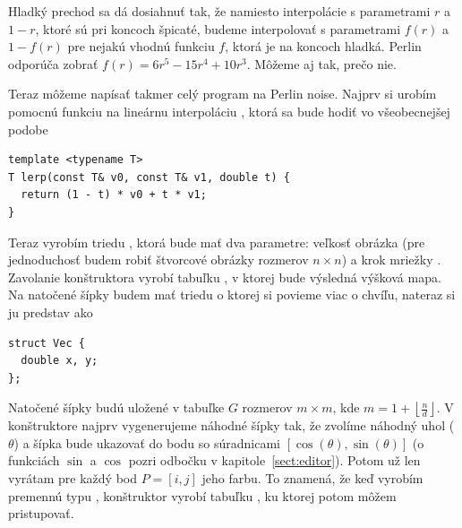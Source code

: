 Hladký prechod sa dá dosiahnuť tak, že namiesto interpolácie s parametrami $r$ a $1-r$, ktoré
sú pri koncoch špicaté, budeme interpolovať s parametrami $f(r)$ a $1-f(r)$ pre nejakú
vhodnú funkciu $f$, ktorá je na koncoch hladká. Perlin odporúča zobrať 
$f(r)=6r^5-15r^4+10r^3$. Môžeme aj tak, prečo nie.

 
Teraz môžeme napísať takmer celý program na Perlin noise. 
Najprv si urobím pomocnú funkciu na lineárnu interpoláciu , ktorá sa
bude hodiť vo všeobecnejšej podobe


\begin{lstlisting}
template <typename T>
T lerp(const T& v0, const T& v1, double t) {
  return (1 - t) * v0 + t * v1;
}
\end{lstlisting}


Teraz vyrobím triedu ,
ktorá bude mať dva parametre:  veľkosť obrázka (pre jednoduchosť budem
robiť štvorcové obrázky rozmerov $n\times n$) a krok mriežky .
Zavolanie konštruktora vyrobí tabuľku , v ktorej bude výsledná výšková
mapa. Na natočené šípky budem mať triedu  o ktorej si povieme viac o 
chvíľu, nateraz si ju predstav ako 


\begin{lstlisting}
struct Vec {
  double x, y;
};
\end{lstlisting}


Natočené šípky budú uložené v tabuľke $G$ rozmerov $m\times m$, kde 
$m=1+\left\lfloor\frac{n}{d}\right\rfloor$. V konštruktore
najprv vygenerujeme náhodné šípky tak, že zvolíme náhodný uhol  ($\theta$)
a šípka bude ukazovať do bodu so súradnicami $[\cos(\theta),\sin(\theta)]$
(o funkciách $\sin$ a $\cos$ pozri odbočku v kapitole~\ref{sect:editor}).
Potom už len vyrátam pre každý bod $P=[i,j]$ jeho farbu.
To znamená, že keď vyrobím premennú typu , konštruktor vyrobí tabuľku ,
ku ktorej potom môžem pristupovať.


